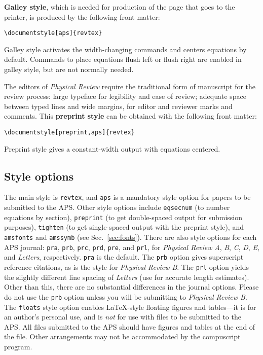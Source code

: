 {\bf Galley style}, which is needed for production of the page that goes to
the printer, is produced by the following front matter:
\begin{verbatim}
\documentstyle[aps]{revtex}

\end{verbatim}
Galley style activates the width-changing commands and centers equations by
default. Commands to place equations flush left or flush right are enabled
in galley style, but are not normally needed.

The editors of {\em Physical Review\/} require the traditional form of
manuscript for the review process: large typeface for legibility and ease
of review; adequate space between typed lines and wide margins, for editor
and reviewer marks and comments. This {\bf preprint style} can be obtained
with the following front matter:
\begin{verbatim}
\documentstyle[preprint,aps]{revtex}

\end{verbatim}
Preprint style gives a constant-width output with equations centered.

\subsection{Style options}

The main style is \verb+revtex+, and \verb+aps+ is a mandatory style option
for papers to be submitted to the APS. Other style options include
\verb+eqsecnum+ (to number equations by section), \verb+preprint+ (to get
double-spaced output for submission purposes), \verb+tighten+ (to get
single-spaced output with the preprint style), and \verb+amsfonts+ and
\verb+amssymb+ (see Sec.\ \ref{sec:fonts}). There are also style options
for each APS journal: \verb+pra+, \verb+prb+, \verb+prc+, \verb+prd+,
\verb+pre+, and \verb+prl+, for {\it Physical Review\/} {\it A}, {\it B},
{\it C}, {\it D}, {\it E}, and {\it Letters}, respectively. \verb+pra+ is
the default. The \verb+prb+ option gives superscript reference citations,
as is the style for {\it Physical Review B}. The \verb+prl+ option yields
the slightly different line spacing of {\em Letters\/} (use for accurate
length estimates). Other than this, there are no substantial differences in
the journal options. Please do not use the \verb+prb+ option unless you
will be submitting to {\it Physical Review B}. The \verb+floats+ style
option enables \LaTeX{}-style floating figures and tables---it is for an
author's personal use, and is {\it not\/} for use with files to be
submitted to the APS. All files submitted to the APS should have figures
and tables at the end of the file. Other arrangements may not be
accommodated by the compuscript program.

